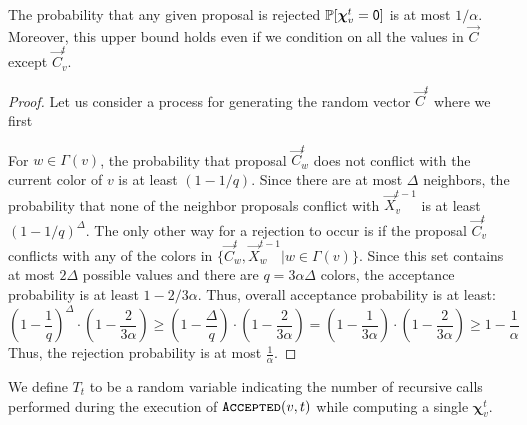 \begin{lemma}
\label{lem:color_reject_probability}
The probability that any given proposal is rejected $\mathbb P[\bm\chi^t_v=\mathsf{0}]$ is at most $1/\alpha$.
Moreover, this upper bound holds even if we condition on all the values in $\vec C$ except $\vec C^t_v$.
\end{lemma}
\begin{proof}
Let us consider a process for generating the random vector $\vec C^t$ where we first

For $w\in \Gamma(v)$, the probability that proposal $\vec C^t_w$ does not conflict with the current color of $v$ is at least $(1-1/q)$.
Since there are at most $\Delta$ neighbors, the probability
that none of the neighbor proposals conflict with $\vec X^{t-1}_v$ is at least $(1-1/q)^{\Delta}$.
The only other way for a rejection to occur is if the proposal $\vec C^t_v$
conflicts with any of the colors in $\{\vec C^t_w, \vec X^{t-1}_w | w\in\Gamma(v)\}$.
Since this set contains at most $2\Delta$ possible values and there are $q=3\alpha\Delta$ colors, the acceptance probability is at least $1-2/3\alpha$.
Thus, overall acceptance probability is at least:
\[
\left(1-\frac{1}{q}\right)^{\Delta}\cdot\left( 1-\frac{2}{3\alpha}\right) \ge \left(1 - \frac{\Delta}{q}\right)\cdot\left( 1-\frac{2}{3\alpha}\right)
= \left(1 - \frac{1}{3\alpha}\right)\cdot\left( 1-\frac{2}{3\alpha}\right) \ge 1 - \frac{1}{\alpha}
\]
Thus, the rejection probability is at most $\frac{1}{\alpha}$.
\end{proof}

\begin{definition}
\label{def:coloring_recursions}
We define $T_t$ to be a random variable indicating the number of recursive calls performed during the execution of $\texttt{\textsc{Accepted}}(v,t)$
while computing a single $\bm \chi_v^t$.
\end{definition}

